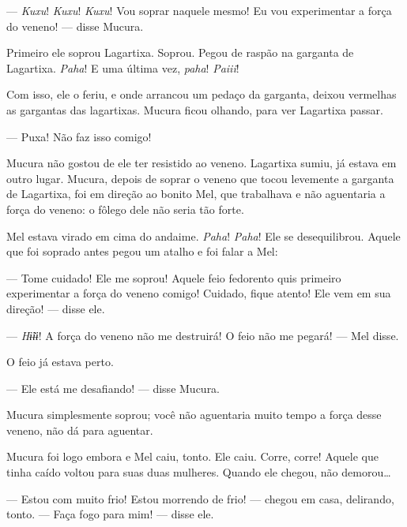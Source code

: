 
--- \textit{Kuxu}! \textit{Kuxu}! \textit{Kuxu}! Vou soprar naquele mesmo! Eu vou experimentar a força do veneno! --- disse Mucura. 

Primeiro ele soprou Lagartixa. Soprou. Pegou de raspão na garganta de
Lagartixa. \textit{Paha}! E uma última vez, \textit{paha}! \textit{Paiii}!

Com isso, ele o feriu, e onde arrancou um pedaço da garganta, deixou
vermelhas as gargantas das lagartixas. Mucura ficou olhando, para ver
Lagartixa passar. 


--- Puxa! Não faz isso comigo! 

Mucura não gostou de ele ter resistido ao veneno. Lagartixa sumiu, já
estava em outro lugar. Mucura, depois de soprar o veneno que tocou
levemente a garganta de Lagartixa, foi em direção ao bonito Mel, que
trabalhava e não aguentaria a força do veneno: o fôlego dele não seria
tão forte. 

Mel estava virado em cima do andaime. \textit{Paha}! \textit{Paha}! Ele se
desequilibrou. Aquele que foi soprado antes pegou um atalho e foi falar
a Mel: 

--- Tome cuidado! Ele me soprou! Aquele feio fedorento quis primeiro
experimentar a força do veneno comigo! Cuidado, fique atento! Ele vem em
sua direção! --- disse ele. 

--- \textit{Hɨ̃ɨɨ}! A força do veneno não me destruirá! O feio não me
pegará! --- Mel disse. 

O feio já estava perto.

--- Ele está me desafiando! --- disse Mucura. 


Mucura simplesmente soprou; você não aguentaria muito tempo a força
desse veneno, não dá para aguentar. 

Mucura foi logo embora e Mel caiu, tonto. Ele caiu. Corre, corre! Aquele
que tinha caído voltou para suas duas mulheres. Quando ele chegou, não
demorou\ldots{}

 --- Estou com muito frio! Estou morrendo de frio! --- chegou em casa,
delirando, tonto. --- Faça fogo para mim! --- disse ele. 

